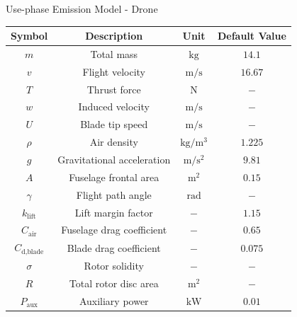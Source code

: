 \documentclass[9pt]{beamer}
\begin{document}
\begin{frame}{Use-phase Emission Model - Drone}


  \begin{center}
    \begin{tabular}{cccc}
      \toprule
      Symbol & Description & Unit & Default Value \\
      \midrule
      $m$ & Total mass & $\mathrm{kg}$ & $14.1$ \\
      $v$ & Flight velocity & $\mathrm{m/s}$ & $16.67$ \\
      $T$ & Thrust force & $\mathrm{N}$ & $-$ \\
      $w$ & Induced velocity & $\mathrm{m/s}$ & $-$ \\
      $U$ & Blade tip speed & $\mathrm{m/s}$ & $-$ \\
      $\rho$ & Air density & $\mathrm{kg/m^3}$ & $1.225$ \\
      $g$ & Gravitational acceleration & $\mathrm{m/s^2}$ & $9.81$ \\
      $A$ & Fuselage frontal area & $\mathrm{m^2}$ & $0.15$ \\
      $\gamma$ & Flight path angle & $\mathrm{rad}$ & $-$ \\
      $k_{\text{lift}}$ & Lift margin factor & $-$ & $1.15$ \\
      $C_{\text{air}}$ & Fuselage drag coefficient & $-$ & $0.65$ \\
      $C_{\text{d,blade}}$ & Blade drag coefficient & $-$ & $0.075$ \\
      $\sigma$ & Rotor solidity & $-$ & $-$ \\
      $R$ & Total rotor disc area & $\mathrm{m^2}$ & $-$ \\
      $P_{\text{aux}}$ & Auxiliary power & $\mathrm{kW}$ & $0.01$ \\
      \bottomrule
    \end{tabular}
  \end{center}
\end{frame}
\end{document}

